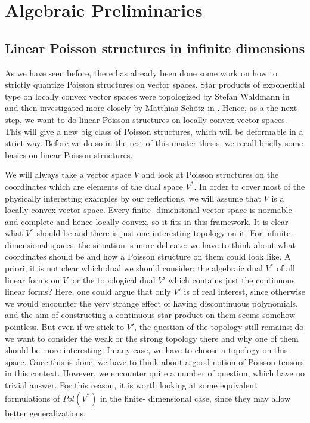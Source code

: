
%
%

\chapter{Algebraic Preliminaries}


\section{Linear Poisson structures in infinite dimensions}
\label{sec:chap3_LinearPoisson}

As we have seen before, there has already been done some work on how to 
strictly quantize Poisson structures on vector spaces. Star products of
exponential type on locally convex vector spaces were topologized by Stefan 
Waldmann in \cite{waldmann:2014a} and then investigated more closely by 
Matthias Schötz in \cite{schoetz:2014a}. Hence, as a the next step, we want 
to do linear Poisson structures on locally convex vector spaces. This 
will give a new big class of Poisson structures, which will be deformable 
in a strict way. Before we do so in the rest of this master thesis, we 
recall briefly some basics on linear Poisson structures.


We will always take a vector space $V$ and look at Poisson structures on 
the coordinates which are elements of the dual space $V^*$. In order to 
cover most of the physically interesting examples by our reflections, we 
will assume that $V$ is a locally convex vector space. Every finite-
dimensional vector space is normable and complete and hence locally convex, 
so it fits in this framework. It is clear what $V^*$ should be and there is 
just one interesting topology on it. For infinite-dimensional spaces, the 
situation is more delicate: we have to think about what coordinates should 
be and how a Poisson structure on them could look like. A priori, it is not 
clear which dual we should consider: the algebraic dual $V^*$ of all linear 
forms on $V$, or the topological dual $V'$ which contains just the 
continuous linear forms? Here, one could argue that only $V'$ is of real 
interest, since otherwise we would encounter the very strange effect of 
having discontinuous polynomials, and the aim of constructing a continuous 
star product on them seems somehow pointless. 
But even if we stick to $V'$, the question of the topology still remains: 
do we want to consider the weak or the strong topology there and why one of 
them should be more interesting. In any case, we have to choose a topology 
on this space. Once this is done, we have to think about a good notion of 
Poisson tensors in this context. However, we encounter quite a number of 
question, which have no trivial answer. For this reason, it is worth 
looking at some equivalent formulations of $Pol(V^*)$ in the finite-
dimensional case, since they may allow better generalizations.


